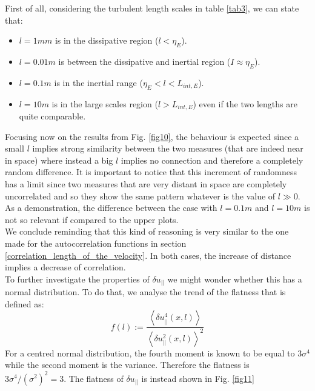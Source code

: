 \documentclass[11pt,titlepage]{article}
\begin{document}
First of all, considering the turbulent length scales in table \ref{tab3}, we can state that:
\begin{itemize}
	\item $l=1mm$ is in the dissipative region ($l<\eta_E$).
	\item $l=0.01m$ is between the dissipative and inertial region ($I \approx \eta_E$).
	\item $l=0.1m$ is in the inertial range ($\eta_E < l < L_{int,E}$).
	\item $l=10m$ is in the large scales region ($l > L_{int,E}$) even if the two lengths are quite comparable.
\end{itemize}

Focusing now on the results from Fig. \ref{fig10}, the behaviour is expected since a small $l$ implies strong similarity between the two measures (that are indeed near in space) where instead a big $l$ implies no connection and therefore a completely random difference. It is important to notice that this increment of randomness has a limit since two measures that are very distant in space are completely uncorrelated and so they show the same pattern whatever is the value of $l\gg0$. As a demonstration, the difference between the case with $l=0.1m$ and $l=10m$ is not so relevant if compared to the upper plots. \\
We conclude reminding that this kind of reasoning is very similar to the one made for the autocorrelation functions in section \ref{correlation_length_of_the_velocity}. In both cases, the increase of distance implies a decrease of correlation. \\
To further investigate the properties of $\delta u_{||}$ we might wonder whether this has a normal distribution. To do that, we analyse the trend of the flatness that is defined as:
\begin{equation*}
	f(l) := \frac{\left<\delta u_{||}^4(x,l)\right>}{{\left<\delta u_{||}^2(x,l)\right>}^2}
\end{equation*}
For a centred normal distribution, the fourth moment is known to be equal to $3\sigma^4$ while the second moment is the variance. Therefore the flatness is $3\sigma^4/(\sigma^2)^2 = 3$. The flatness of $\delta u_{||}$ is instead shown in Fig. \ref{fig11}
\end{document}
